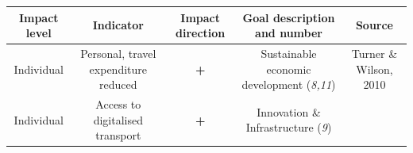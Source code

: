 \documentclass[
]{book}
\begin{document}
\begin{longtable}[]{@{}ccccc@{}}
\toprule
\begin{minipage}[b]{0.17\columnwidth}\centering
Impact level\strut
\end{minipage} & \begin{minipage}[b]{0.16\columnwidth}\centering
Indicator\strut
\end{minipage} & \begin{minipage}[b]{0.17\columnwidth}\centering
Impact direction\strut
\end{minipage} & \begin{minipage}[b]{0.17\columnwidth}\centering
Goal description and number\strut
\end{minipage} & \begin{minipage}[b]{0.17\columnwidth}\centering
Source\strut
\end{minipage}\tabularnewline
\midrule
\endhead
\begin{minipage}[t]{0.17\columnwidth}\centering
Individual\strut
\end{minipage} & \begin{minipage}[t]{0.16\columnwidth}\centering
Personal, travel expenditure reduced\strut
\end{minipage} & \begin{minipage}[t]{0.17\columnwidth}\centering
\textbf{+}\strut
\end{minipage} & \begin{minipage}[t]{0.17\columnwidth}\centering
Sustainable economic development (\emph{8,11})\strut
\end{minipage} & \begin{minipage}[t]{0.17\columnwidth}\centering
Turner \& Wilson, 2010\strut
\end{minipage}\tabularnewline
\begin{minipage}[t]{0.17\columnwidth}\centering
Individual\strut
\end{minipage} & \begin{minipage}[t]{0.16\columnwidth}\centering
Access to digitalised transport\strut
\end{minipage} & \begin{minipage}[t]{0.17\columnwidth}\centering
\textbf{+}\strut
\end{minipage} & \begin{minipage}[t]{0.17\columnwidth}\centering
Innovation \& Infrastructure (\emph{9})\strut
\end{minipage} & \begin{minipage}[t]{0.17\columnwidth}\centering

\end{minipage}
\end{longtable}
\end{document}
